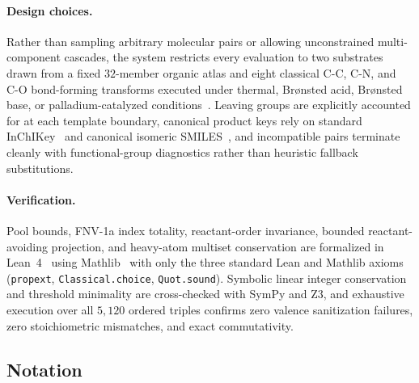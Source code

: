 \documentclass[11pt,a4paper]{article}
\theoremstyle{plain}
\theoremstyle{definition}
\theoremstyle{remark}
\newcommand{\chem}[1]{\ensuremath{\mathrm{#1}}}
\begin{document}
\paragraph{Design choices.} Rather than sampling arbitrary molecular pairs or allowing unconstrained
multi-component cascades, the system restricts every evaluation to two substrates drawn from a
fixed \( 32 \)-member organic atlas and eight classical \chem{C\text{-}C}, \chem{C\text{-}N}, and
\chem{C\text{-}O} bond-forming transforms executed under thermal, Br\o{}nsted acid, Br\o{}nsted base,
or palladium-catalyzed conditions~\cite{Baumann1886,DielsAlder1928,FischerSpeier1895,Schiff1864,
Schotten1884,Williamson1850,Michael1887,MiyauraSuzuki1995,Wurtz1872}. Leaving groups are
explicitly accounted for at each
template boundary, canonical product keys rely on standard InChIKey~\cite{Heller2015} and
canonical isomeric SMILES~\cite{Weininger1988}, and incompatible pairs terminate cleanly with
functional-group diagnostics rather than heuristic fallback substitutions.

\paragraph{Verification.} Pool bounds, FNV-1a index totality, reactant-order invariance,
bounded reactant-avoiding projection, and heavy-atom multiset conservation are formalized in
Lean~4~\cite{deMouraUllrich2021} using Mathlib~\cite{Mathlib2020} with only the three standard
Lean and Mathlib axioms (\texttt{propext}, \texttt{Classical.choice}, \texttt{Quot.sound}).
Symbolic linear integer conservation and threshold minimality are cross-checked with SymPy
and Z3, and exhaustive execution over all \( 5{,}120 \) ordered triples confirms zero valence
sanitization failures, zero stoichiometric mismatches, and exact commutativity.

\subsection{Notation}\label{sec:notation}
\end{document}
